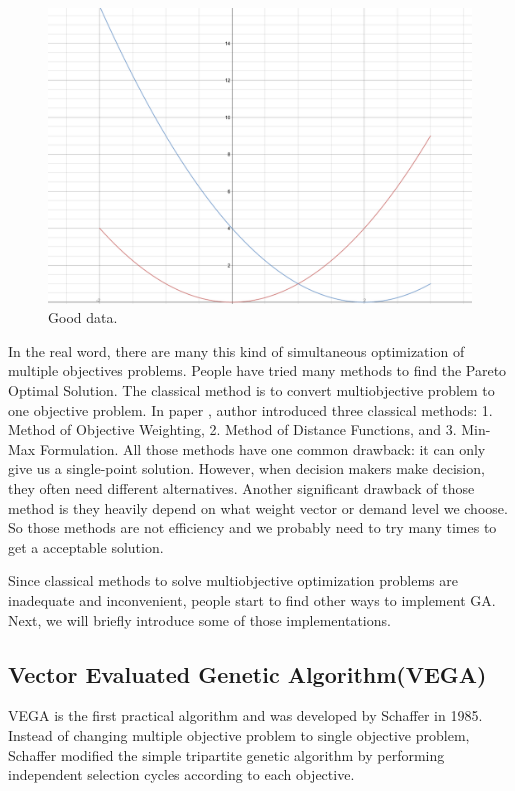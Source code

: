 \begin{figure}[htp] 
\centering
\includegraphics[scale=.4]{images/Figure_1.png}
\caption{Good data.}
\label{fig:goodData}
\end{figure}

In the real word, there are many this kind of simultaneous optimization of multiple objectives problems. People have tried many methods to find the Pareto Optimal Solution. The classical method is to convert multiobjective problem to one objective problem. In paper \cite{NSGA_1994}, author introduced three classical methods: 1. Method of Objective Weighting, 2. Method of Distance Functions, and 3. Min-Max Formulation. All those methods have one common drawback: it can only give us a single-point solution. However, when decision makers make decision, they often need different alternatives. Another significant drawback of those method is they heavily depend on what weight vector or demand level we choose. So those methods are not efficiency and we probably need to try many times to get a acceptable solution.

Since classical methods to solve multiobjective optimization problems are inadequate and inconvenient, people start to find other ways to implement GA. Next, we will briefly introduce some of those implementations.

\subsection{Vector Evaluated Genetic Algorithm(VEGA)}
VEGA is the first practical algorithm and was developed by Schaffer in 1985\cite{Schaffer_1985_Some}. Instead of changing multiple objective problem to single objective problem, Schaffer modified the simple tripartite genetic algorithm by performing independent selection cycles according to each objective.

